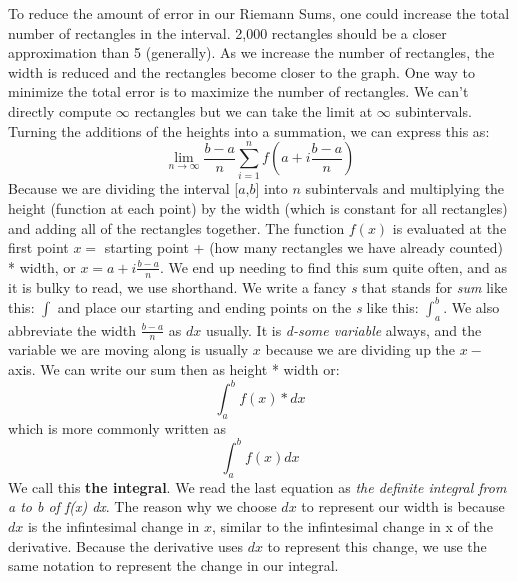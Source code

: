 \documentclass[../revisedmain.tex]{subfiles}
\begin{document}
To reduce the amount of error in our Riemann Sums, one could increase the total number of rectangles in the interval. 2,000 rectangles should be a closer approximation than 5 (generally). As we increase the number of rectangles, the width is reduced and the rectangles become closer to the graph. One way to minimize the total error is to maximize the number of rectangles. We can't directly compute $\infty$ rectangles but we can take the limit at $\infty$ subintervals. Turning the additions of the heights into a summation, we can express this as:$$\lim_{n\to\infty}\frac{b-a}{n}\sum_{i=1}^{n} f(a+i\frac{b-a}{n}) $$ Because we are dividing the interval [$a$,$b$] into $n$ subintervals and multiplying the height (function at each point) by the width (which is constant for all rectangles) and adding all of the rectangles together. The function $f(x)$ is evaluated at the first point $x=$ starting point + (how many rectangles we have already counted) * width, or $x=a+i\displaystyle\frac{b-a}{n}$. We end up needing to find this sum quite often, and as it is bulky to read, we use shorthand. We write a fancy \textit{s} that stands for \textit{sum} like this: $\int$ and place our starting and ending points on the \textit{s} like this: $\displaystyle\int_{a}^{b}$. We also abbreviate the width $\displaystyle\frac{b-a}{n}$ as $dx$ usually. It is \textit{d-some variable} always, and the variable we are moving along is usually $x$ because we are dividing up the $x-$axis. We can write our sum then as height * width or: $$\int_{a}^{b} f(x)*dx$$which is more commonly written as $$\int_{a}^{b}f(x)dx$$ We call this \textbf{the integral}. We read the last equation as \textit{the definite integral from a to b of f(x) dx}. The reason why we choose $dx$ to represent our width is because $dx$ is the infintesimal change in $x$, similar to the infintesimal change in x of the derivative. Because the derivative uses $dx$ to represent this change, we use the same notation to represent the change in our integral.
\end{document}
